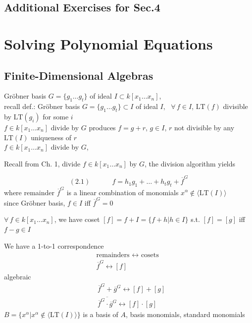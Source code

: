 \subsection*{Additional Exercises for Sec.4}




\section{ Solving Polynomial Equations}

\subsection{}

\subsection{Finite-Dimensional Algebras}

Gr\"obner basis $G = \lbrace g_1 \dots g_t \rbrace$ of ideal $I\subset k[x_1\dots x_n]$, \\
recall def.: Gr\"obner basis $G = \lbrace g_1 \dots g_t\rbrace \subset I$ of ideal $I$, \, $\forall \, f \in I$, $\text{LT}(f)$ divisible by $\text{LT}(g_i)$ for some $i$ \\
\phantom{\quad \, } $f \in k[x_1\dots x_n]$ divide by $G$ produces $f=g+r$, $g\in I$, $r$ not divisible by any $\text{LT}(I)$ uniqueness of $r$ \\
$f\in k[x_1 \dots x_n]$ divide by $G$, 

Recall from Ch. 1, divide $f\in k[x_1 \dots x_n]$ by $G$, the division algorithm yields

\begin{equation}
  (2.1)  \quad \quad \quad \, f = h_1 g_1 + \dots + h_t g_t + \overline{f}^G
\end{equation}
where remainder $\overline{f}^G$ is a linear combination of monomials $x^{\alpha} \notin \langle \text{LT}(I) \rangle $ \\
\phantom{\quad } since Gr\"obner basis, $f\in I$ iff $\overline{f}^G=0$

$\forall \, f \in k[x_1\dots x_n]$, we have coset $[f] = f+I = \lbrace f +h|h\in I\rbrace$ s.t. $[f]=[g]$ iff $f- g \in I$

We have a 1-to-1 correspondence 
\[
\begin{gathered}
\text{remainders } \leftrightarrow \text{ cosets } \\
\overline{f}^G \leftrightarrow [f]
\end{gathered}
\]
algebraic
\[
\begin{aligned}
  & \overline{f}^G + \overline{g}^G \leftrightarrow [f] + [g] \\ 
  & \overline{ \overline{f}^G \cdot \overline{g}^G } \leftrightarrow [f]\cdot [g]
\end{aligned}
\]
$B = \lbrace x^{\alpha} | x^{\alpha} \notin \langle \text{LT}(I) \rangle \rbrace$ is a basis of $A$, basis monomials, standard monomials

